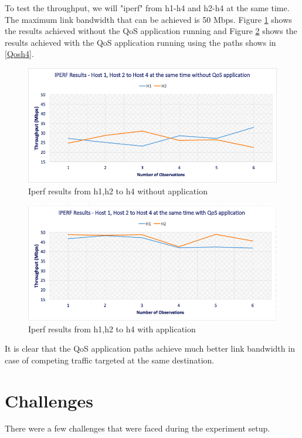 \documentclass[paper=a4, fontsize=12pt]{scrartcl}	%
\numberwithin{equation}{section}		%
\numberwithin{figure}{section}			%
\numberwithin{table}{section}				%
\begin{document}
To test the throughput, we will "iperf" from h1-h4 and h2-h4 at the same time. The maximum link bandwidth that can be achieved is 50 Mbps. Figure \ref{h124WO} shows the results achieved without the QoS application running and Figure \ref{h124W} shows the results achieved with the QoS application running using the paths shows in \ref{Qosh4}. 
\begin{figure}[H]
\begin{center}
\includegraphics[scale=0.45]{h124WO.png}   
\end{center}
 \caption{Iperf results from h1,h2 to h4 without application}
 \label{h124WO}
\end{figure}
\begin{figure}[H]
\begin{center}
\includegraphics[scale=0.45]{h124W.png}   
\end{center}
 \caption{Iperf results from h1,h2 to h4 with application}
 \label{h124W}
\end{figure}
It is clear that the QoS application paths achieve much better link bandwidth in case of competing traffic targeted at the same destination.
\section{Challenges}
There were a few challenges that were faced during the experiment setup.
\end{document}
